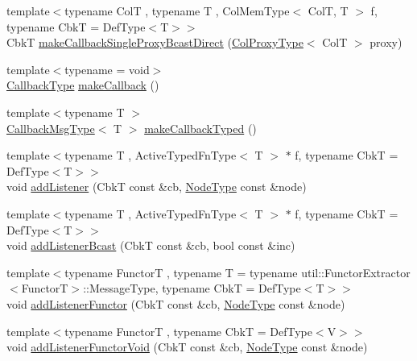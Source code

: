 \begin{DoxyCompactItemize}
\item 
{\footnotesize template$<$typename ColT , typename T , Col\+Mem\+Type$<$ Col\+T, T $>$ f, typename CbkT  = Def\+Type$<$\+T$>$$>$ }\\CbkT \hyperlink{structvt_1_1pipe_1_1_pipe_manager_t_l_aff70024da9ee15ef2c935ca21d18a80d}{make\+Callback\+Single\+Proxy\+Bcast\+Direct} (\hyperlink{structvt_1_1pipe_1_1_pipe_manager_t_l_af56c58cad882496e35f01227d4da3898}{Col\+Proxy\+Type}$<$ ColT $>$ proxy)
\item 
{\footnotesize template$<$typename  = void$>$ }\\\hyperlink{structvt_1_1pipe_1_1_pipe_manager_t_l_a1cc1d0f1c80a36488f9b5d282e9755d2}{Callback\+Type} \hyperlink{structvt_1_1pipe_1_1_pipe_manager_t_l_aff965bd75d398d45ad11d33feeb7a7c5}{make\+Callback} ()
\item 
{\footnotesize template$<$typename T $>$ }\\\hyperlink{structvt_1_1pipe_1_1_pipe_manager_t_l_af6fc2c17f1729fa06450441b0ee81cb1}{Callback\+Msg\+Type}$<$ T $>$ \hyperlink{structvt_1_1pipe_1_1_pipe_manager_t_l_a9644742f82b43a851e8a20755302a2e0}{make\+Callback\+Typed} ()
\item 
{\footnotesize template$<$typename T , Active\+Typed\+Fn\+Type$<$ T $>$ $\ast$ f, typename CbkT  = Def\+Type$<$\+T$>$$>$ }\\void \hyperlink{structvt_1_1pipe_1_1_pipe_manager_t_l_a379d983dfbf654ed01281d96148175f3}{add\+Listener} (CbkT const \&cb, \hyperlink{namespacevt_a866da9d0efc19c0a1ce79e9e492f47e2}{Node\+Type} const \&node)
\item 
{\footnotesize template$<$typename T , Active\+Typed\+Fn\+Type$<$ T $>$ $\ast$ f, typename CbkT  = Def\+Type$<$\+T$>$$>$ }\\void \hyperlink{structvt_1_1pipe_1_1_pipe_manager_t_l_abf50654cc9c8823790a0bb8fe0d0024f}{add\+Listener\+Bcast} (CbkT const \&cb, bool const \&inc)
\item 
{\footnotesize template$<$typename FunctorT , typename T  = typename util\+::\+Functor\+Extractor$<$\+Functor\+T$>$\+::\+Message\+Type, typename CbkT  = Def\+Type$<$\+T$>$$>$ }\\void \hyperlink{structvt_1_1pipe_1_1_pipe_manager_t_l_abc9236c8ff7a657b1b04fd7604d616b9}{add\+Listener\+Functor} (CbkT const \&cb, \hyperlink{namespacevt_a866da9d0efc19c0a1ce79e9e492f47e2}{Node\+Type} const \&node)
\item 
{\footnotesize template$<$typename FunctorT , typename CbkT  = Def\+Type$<$\+V$>$$>$ }\\void \hyperlink{structvt_1_1pipe_1_1_pipe_manager_t_l_a12cd5abf9d9a082369419a5cc5b7b0f8}{add\+Listener\+Functor\+Void} (CbkT const \&cb, \hyperlink{namespacevt_a866da9d0efc19c0a1ce79e9e492f47e2}{Node\+Type} const \&node)

\end{DoxyCompactItemize}
